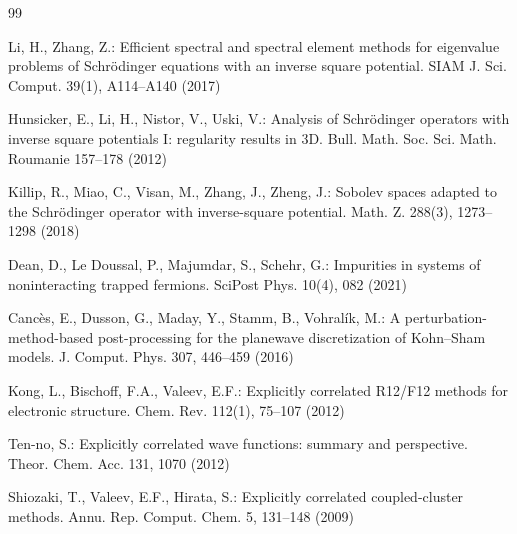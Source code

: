 \documentclass{sn-jnl}%
\numberwithin{equation}{section}
\theoremstyle{thmstyleone}%
\theoremstyle{thmstyletwo}%
\theoremstyle{thmstylethree}%
\begin{document}

\begin{thebibliography}{99}

Li, H., Zhang, Z.: Efficient spectral and spectral element methods for eigenvalue problems of Schrödinger equations with an inverse square potential.
SIAM J. Sci. Comput. 39(1), A114--A140 (2017)

Hunsicker, E., Li, H., Nistor, V., Uski, V.: Analysis of Schrödinger operators with inverse square potentials I: regularity results in 3D.
Bull. Math. Soc. Sci. Math. Roumanie 157--178 (2012)

Killip, R., Miao, C., Visan, M., Zhang, J., Zheng, J.: Sobolev spaces adapted to the Schrödinger operator with inverse-square potential.
Math. Z. 288(3), 1273--1298 (2018)

Dean, D., Le Doussal, P., Majumdar, S., Schehr, G.: Impurities in systems of noninteracting trapped fermions.
SciPost Phys. 10(4), 082 (2021)

Cancès, E., Dusson, G., Maday, Y., Stamm, B., Vohralík, M.: A perturbation-method-based post-processing for the planewave discretization of Kohn--Sham models.
J. Comput. Phys. 307, 446--459 (2016)

Kong, L., Bischoff, F.A., Valeev, E.F.: Explicitly correlated R12/F12 methods for electronic structure.
Chem. Rev. 112(1), 75--107 (2012)

Ten-no, S.: Explicitly correlated wave functions: summary and perspective.
Theor. Chem. Acc. 131, 1070 (2012)

Shiozaki, T., Valeev, E.F., Hirata, S.: Explicitly correlated coupled-cluster methods.
Annu. Rep. Comput. Chem. 5, 131--148 (2009)


\end{thebibliography}
\end{document}
